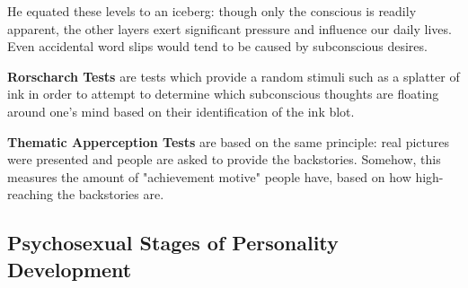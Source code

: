 \documentclass[12pt]{article}
\begin{document}
He equated these levels to an iceberg: though only the conscious is readily apparent, the other layers exert significant pressure and influence our daily lives. Even accidental word slips would tend to be caused by subconscious desires.

{\bf Rorscharch Tests} are tests which provide a random stimuli such as a splatter of ink in order to attempt to determine which subconscious thoughts are floating around one's mind based on their identification of the ink blot.

{\bf Thematic Apperception Tests} are based on the same principle: real pictures were presented and people are asked to provide the backstories. Somehow, this measures the amount of "achievement motive" people have, based on how high-reaching the backstories are.

\subsection*{Psychosexual Stages of Personality Development}
\end{document}
